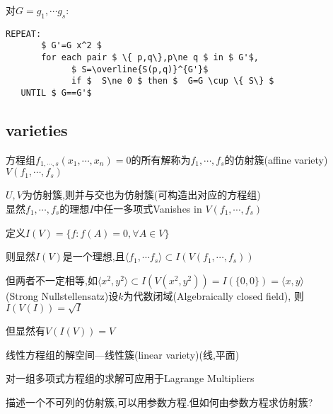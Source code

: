 对$ G={g_1,\cdots g_s}$:

\begin{lstlisting}[mathescape]
   REPEAT:
       $ G'=G x^2 $
       for each pair $ \{ p,q\},p\ne q $ in $ G'$,
             $ S=\overline{S(p,q)}^{G'}$
             if $  S\ne 0 $ then $  G=G \cup \{ S\} $
   UNTIL $ G==G'$
\end{lstlisting}


\subsection{varieties}
方程组$ f_{1,\cdots,s}(x_1,\cdots,x_n)=0$的所有解称为$ f_1,\cdots,f_s$的仿射簇(affine variety)$ V(f_1,\cdots,f_s)$

$ U,V$为仿射簇,则并与交也为仿射簇(可构造出对应的方程组)
\\

显然$ f_1,\cdots,f_s$的理想$ I$中任一多项式Vanishes in $ V(f_1,\cdots,f_s)$

定义$ I(V)=\{f:f(A)=0 ,\forall A \in V\}$

则显然$ I(V)$是一个理想,且$  \langle f_1,\cdots f_s \rangle  \subset I(V(f_1,\cdots,f_s))$

但两者不一定相等,如$  \langle x^2,y^2 \rangle \subset I(V(x^2,y^2))=I(\{0,0\})= \langle x,y \rangle $
\\

(Strong Nullstellensatz)设$ k$为代数闭域(Algebraically closed field),
则$ I(V(I))=\sqrt{I}$

但显然有$ V(I(V))=V$

线性方程组的解空间---线性簇(linear variety)(线,平面)

对一组多项式方程组的求解可应用于Lagrange Multipliers

描述一个不可列的仿射簇,可以用参数方程.但如何由参数方程求仿射簇?

